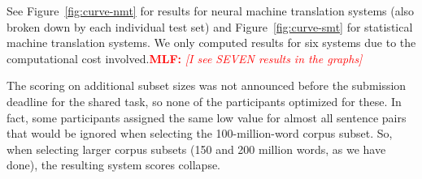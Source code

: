 \documentclass[11pt,a4paper]{article}
\newcommand{\todomlf}[1] {\textcolor{red}{\textbf{MLF:} \em [#1]}\marginpar{\textcolor{red}{\Large \textbf{!!!}}}}
\begin{document}
See Figure~\ref{fig:curve-nmt} for results for neural machine translation systems (also broken down by each individual test set) and Figure~\ref{fig:curve-smt} for statistical machine translation systems. We only computed results for six systems due to the computational cost involved.\todomlf{I see SEVEN results in the graphs}



\begin{figure*}
\begin{center}


\vspace{-0mm}



\vspace{-2mm}



\vspace{-2mm}


\end{center}
\vspace{-2mm}
\caption{Additional corpus sizes, with breakdown by individual test set for some high-performing submissions. The charts plot BLEU scores against the size of the subselected corpus (in millions of words). The curves peak around 100 million words.}
\label{fig:curve-nmt}
\end{figure*}

\begin{figure*}
\begin{center}

\end{center}
\vspace{-5mm}
\caption{Version of Figure~\ref{fig:curve-nmt} for statistical machine translation systems built from the subselected data. Note that the curves are flatter, and the several systems score in a narrow band of 1 BLEU point across a wide range of corpus sizes (30-200 million words), indicated in grey.}
\label{fig:curve-smt}
\end{figure*}

The scoring on additional subset sizes was not announced before the submission deadline for the shared task, so none of the participants optimized for these. In fact, some participants assigned the same low value for almost all sentence pairs that would be ignored when selecting the 100-million-word corpus subset. So, when selecting larger corpus subsets (150 and 200 million words, as we have done), the resulting system scores collapse.
\end{document}
